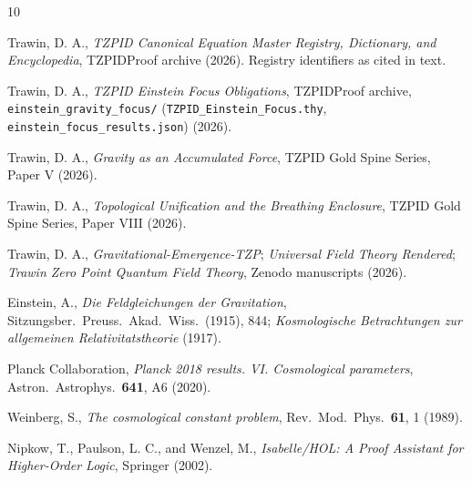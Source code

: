 \documentclass[11pt]{article}
\theoremstyle{remark}
\begin{document}
\begin{thebibliography}{10}

 Trawin, D. A., \emph{TZPID Canonical Equation Master Registry, Dictionary, and Encyclopedia}, TZPIDProof archive (2026). Registry identifiers as cited in text.

 Trawin, D. A., \emph{TZPID Einstein Focus Obligations}, TZPIDProof archive, \texttt{einstein\_gravity\_focus/} (\texttt{TZPID\_Einstein\_Focus.thy}, \texttt{einstein\_focus\_results.json}) (2026).

 Trawin, D. A., \emph{Gravity as an Accumulated Force}, TZPID Gold Spine Series, Paper V (2026).

 Trawin, D. A., \emph{Topological Unification and the Breathing Enclosure}, TZPID Gold Spine Series, Paper VIII (2026).

 Trawin, D. A., \emph{Gravitational-Emergence-TZP}; \emph{Universal Field Theory Rendered}; \emph{Trawin Zero Point Quantum Field Theory}, Zenodo manuscripts (2026).

 Einstein, A., \emph{Die Feldgleichungen der Gravitation}, Sitzungsber.\ Preuss.\ Akad.\ Wiss.\ (1915), 844; \emph{Kosmologische Betrachtungen zur allgemeinen Relativitatstheorie} (1917).

 Planck Collaboration, \emph{Planck 2018 results. VI. Cosmological parameters}, Astron.\ Astrophys.\ \textbf{641}, A6 (2020).

 Weinberg, S., \emph{The cosmological constant problem}, Rev.\ Mod.\ Phys.\ \textbf{61}, 1 (1989).

 Nipkow, T., Paulson, L. C., and Wenzel, M., \emph{Isabelle/HOL: A Proof Assistant for Higher-Order Logic}, Springer (2002).

\end{thebibliography}
\end{document}
